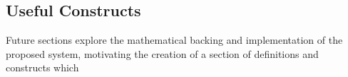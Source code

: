 \subsection{Useful Constructs}

Future sections explore the mathematical backing and implementation of the proposed system, motivating the creation of a section of definitions and constructs which 